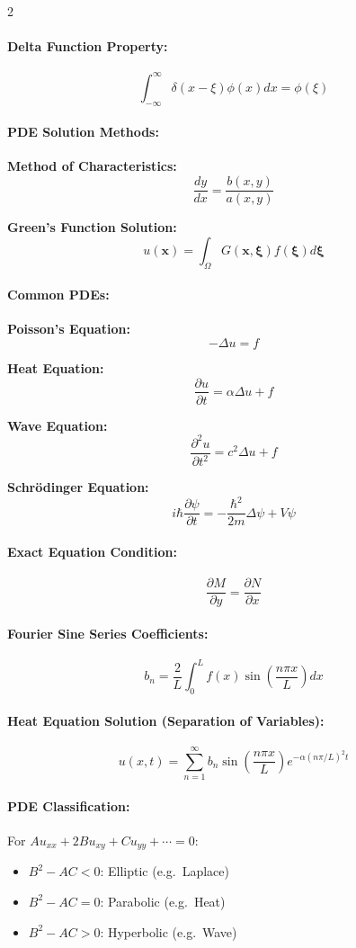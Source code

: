 \begin{multicols}{2}
\paragraph{Delta Function Property:}
\[
\int_{-\infty}^{\infty} \delta(x-\xi)\phi(x)dx = \phi(\xi)
\]

\paragraph{PDE Solution Methods:}

\textbf{Method of Characteristics:}
\[
\frac{dy}{dx} = \frac{b(x,y)}{a(x,y)}
\]

\textbf{Green's Function Solution:}
\[
u(\mathbf{x}) = \int_{\Omega} G(\mathbf{x},\boldsymbol{\xi})f(\boldsymbol{\xi})d\boldsymbol{\xi}
\]

\paragraph{Common PDEs:}

\textbf{Poisson's Equation:}
\[
-\Delta u = f
\]

\textbf{Heat Equation:}
\[
\frac{\partial u}{\partial t} = \alpha\Delta u + f
\]

\textbf{Wave Equation:}
\[
\frac{\partial^2 u}{\partial t^2} = c^2\Delta u + f
\]

\textbf{Schrödinger Equation:}
\[
i\hbar\frac{\partial \psi}{\partial t} = -\frac{\hbar^2}{2m}\Delta \psi + V\psi
\]

\paragraph{Exact Equation Condition:}
\[
\frac{\partial M}{\partial y} = \frac{\partial N}{\partial x}
\]

\paragraph{Fourier Sine Series Coefficients:}
\[
b_n = \frac{2}{L} \int_0^L f(x) \sin\left(\frac{n\pi x}{L}\right) dx
\]

\paragraph{Heat Equation Solution (Separation of Variables):}
\[
u(x,t) = \sum_{n=1}^{\infty} b_n \sin\left(\frac{n\pi x}{L}\right) e^{-\alpha (n\pi/L)^2 t}
\]

\paragraph{PDE Classification:}
For $Au_{xx} + 2Bu_{xy} + Cu_{yy} + \cdots = 0$:
\begin{itemize}
    \item $B^2 - AC < 0$: Elliptic (e.g.\ Laplace)
    \item $B^2 - AC = 0$: Parabolic (e.g.\ Heat)
    \item $B^2 - AC > 0$: Hyperbolic (e.g.\ Wave)
\end{itemize}


\end{multicols}
